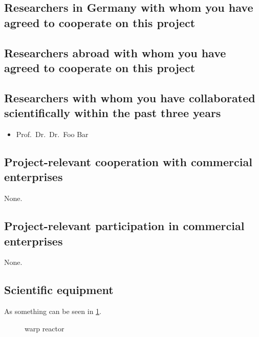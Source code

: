 \documentclass[final]{scrartcl}
\begin{document}
\subsection{Researchers in Germany with whom you have agreed to cooperate on this project}

\subsection{Researchers abroad with whom you have agreed to cooperate on this project}

\subsection{Researchers with whom you have collaborated scientifically within the past three years}
\begin{itemize}
  \item Prof.\ Dr.\ Dr.\ Foo Bar
\end{itemize}

\subsection{Project-relevant cooperation with commercial enterprises}
None.

\subsection{Project-relevant participation in commercial enterprises}
None.

\subsection{Scientific equipment}
As something can be seen in \cref{fig:some_nice_graph}.

\begin{figure}
\centering
{}
\caption{warp reactor}
\label{fig:some_nice_graph}
\end{figure}
\end{document}
